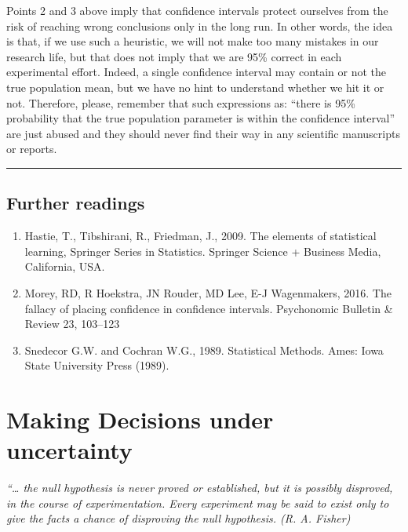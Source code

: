 \documentclass[a4paper,12pt,oneside]{book}
\providecommand{\tightlist}{%
  \setlength{\itemsep}{0pt}\setlength{\parskip}{0pt}}
\begin{document}
Points 2 and 3 above imply that confidence intervals protect ourselves from the risk of reaching wrong conclusions only in the long run. In other words, the idea is that, if we use such a heuristic, we will not make too many mistakes in our research life, but that does not imply that we are 95\% correct in each experimental effort. Indeed, a single confidence interval may contain or not the true population mean, but we have no hint to understand whether we hit it or not. Therefore, please, remember that such expressions as: ``there is 95\% probability that the true population parameter is within the confidence interval'' are just abused and they should never find their way in any scientific manuscripts or reports.

\begin{center}\rule{0.5\linewidth}{0.5pt}\end{center}

\hypertarget{further-readings-3}{%
\section{Further readings}\label{further-readings-3}}

\begin{enumerate}
\def\labelenumi{\arabic{enumi}.}
\tightlist
\item
  Hastie, T., Tibshirani, R., Friedman, J., 2009. The elements of statistical learning, Springer Series in Statistics. Springer Science + Business Media, California, USA.
\item
  Morey, RD, R Hoekstra, JN Rouder, MD Lee, E-J Wagenmakers, 2016. The fallacy of placing confidence in confidence intervals. Psychonomic Bulletin \& Review 23, 103--123
\item
  Snedecor G.W. and Cochran W.G., 1989. Statistical Methods. Ames: Iowa State University Press (1989).
\end{enumerate}

\hypertarget{making-decisions-under-uncertainty}{%
\chapter{Making Decisions under uncertainty}\label{making-decisions-under-uncertainty}}

\emph{``\ldots{} the null hypothesis is never proved or established, but it is possibly disproved, in the course of experimentation. Every experiment may be said to exist only to give the facts a chance of disproving the null hypothesis. (R. A. Fisher)}
\end{document}
